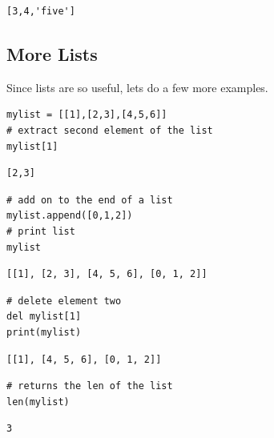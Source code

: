 \documentclass[%
oneside,                 %
final,                   %
10pt]{article}
\begin{document}
\begin{Verbatim}[numbers=none,fontsize=\fontsize{9pt}{9pt},baselinestretch=0.95,xleftmargin=2mm]
[3,4,'five']
\end{Verbatim}

\subsection{More Lists}

Since lists are so useful, lets do a few more examples.

\begin{Verbatim}[numbers=none,fontsize=\fontsize{9pt}{9pt},baselinestretch=0.95,xleftmargin=2mm]
mylist = [[1],[2,3],[4,5,6]]
# extract second element of the list
mylist[1]
\end{Verbatim}

\begin{Verbatim}[numbers=none,fontsize=\fontsize{9pt}{9pt},baselinestretch=0.95,xleftmargin=2mm]
[2,3]
\end{Verbatim}


\begin{Verbatim}[numbers=none,fontsize=\fontsize{9pt}{9pt},baselinestretch=0.95,xleftmargin=2mm]
# add on to the end of a list
mylist.append([0,1,2])
# print list
mylist
\end{Verbatim}

\begin{Verbatim}[numbers=none,fontsize=\fontsize{9pt}{9pt},baselinestretch=0.95,xleftmargin=2mm]
[[1], [2, 3], [4, 5, 6], [0, 1, 2]]
\end{Verbatim}


\begin{Verbatim}[numbers=none,fontsize=\fontsize{9pt}{9pt},baselinestretch=0.95,xleftmargin=2mm]
# delete element two
del mylist[1]
print(mylist)
\end{Verbatim}

\begin{Verbatim}[numbers=none,fontsize=\fontsize{9pt}{9pt},baselinestretch=0.95,xleftmargin=2mm]
[[1], [4, 5, 6], [0, 1, 2]]
\end{Verbatim}


\begin{Verbatim}[numbers=none,fontsize=\fontsize{9pt}{9pt},baselinestretch=0.95,xleftmargin=2mm]
# returns the len of the list
len(mylist)
\end{Verbatim}

\begin{Verbatim}[numbers=none,fontsize=\fontsize{9pt}{9pt},baselinestretch=0.95,xleftmargin=2mm]
3
\end{Verbatim}
\end{document}
